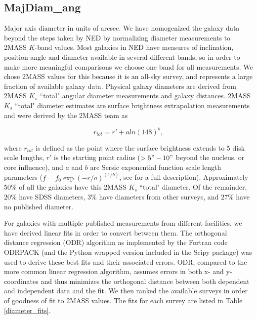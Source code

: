 \documentclass[twocolumn,tighten]{aastex62}
\begin{document}
\subsection{MajDiam\_ang} \label{diameters}
Major axis diameter in units of arcsec. We have homogenized the galaxy data beyond the steps taken by NED by normalizing diameter measurements to 2MASS $K$-band values. Most galaxies in NED have measures of inclination, position angle and diameter available in several different bands, so in order to make more meaningful comparisons we choose one band for all measurements. We chose 2MASS values for this because it is an all-sky survey, and represents a large fraction of available galaxy data. Physical galaxy diameters are derived from 2MASS $K_s$ ``total" angular diameter measurements and galaxy distances. 2MASS $K_s$ ``total" diameter estimates are surface brightness extrapolation measurements and were derived by the 2MASS team as 

\begin{equation}
r_{tot} = r' + a ln(148)^b,
\end{equation}

\noindent where $r_{tot}$ is defined as the point where the surface brightness extends to 5 disk scale lengths, $r'$ is the starting point radius ($>5" - 10"$ beyond the nucleus, or core influence), and $a$ and $b$ are Sersic exponential function scale length parameters ($f = f_0 \exp{(-r/a)}^{(1/b)}$, see \citealt{jarrett2003} for a full description). Approximately $50\%$ of all the galaxies have this 2MASS $K_s$ ``total" diameter. Of the remainder, $20\%$ have SDSS diameters, $3\%$ have diameters from other surveys, and $27\%$ have no published diameter. 

For galaxies with multiple published measurements from different facilities, we have derived linear fits in order to convert between them. The orthogonal distance regression (ODR) algorithm as implemented by the Fortran code ODRPACK (and the Python wrapped version included in the Scipy package) was used to derive these best fits and their associated errors. ODR, compared to the more common linear regression algorithm, assumes errors in both x- and y-coordinates and thus minimizes the orthogonal distance between both dependent and independent data and the fit. We then ranked the available surveys in order of goodness of fit to 2MASS values. The fits for each survey are listed in Table \ref{diameter_fits}. 
\end{document}
